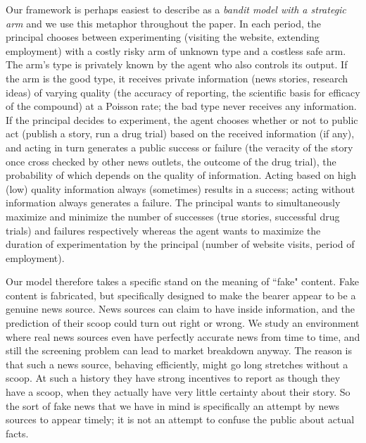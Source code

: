 \documentclass[11pt,reqno]{amsart}
\begin{document}
Our framework is perhaps easiest to describe as a \textit{bandit model with a strategic arm} and we use this metaphor throughout the paper. In each period, the principal chooses between experimenting (visiting the website, extending employment) with a costly risky arm of unknown type and a costless safe arm. The arm's type is privately known by the agent who also controls its output. If the arm is the good type, it receives private information (news stories, research ideas) of varying quality (the accuracy of reporting, the scientific basis for efficacy of the compound) at a Poisson rate; the bad type never receives any information. If the principal decides to experiment, the agent chooses whether or not to public act (publish a story, run a drug trial) based on the received information (if any), and acting in turn generates a public success or failure (the veracity of the story once cross checked by other news outlets, the outcome of the drug trial), the probability of which depends on the quality of information. Acting based on high (low) quality information always (sometimes) results in a success; acting without information always generates a failure. The principal wants to simultaneously maximize and minimize the number of successes (true stories, successful drug trials) and failures respectively whereas the agent wants to maximize the duration of experimentation by the principal (number of website visits, period of employment).

Our model therefore takes a specific stand on the meaning of ``fake" content. Fake content is fabricated, but specifically designed to make the bearer appear to be a genuine news source. News sources can claim to have inside information, and the prediction of their scoop could turn out right or wrong. We study an environment where real news sources even have perfectly accurate news from time to time, and still the screening problem can lead to market breakdown anyway. The reason is that such a news source, behaving efficiently, might go long stretches without a scoop. At such a history they have strong incentives to report as though they have a scoop, when they actually have very little certainty about their story. So the sort of fake news that we have in mind is specifically an attempt by news sources to appear timely; it is not an attempt to confuse the public about actual facts.
\end{document}
